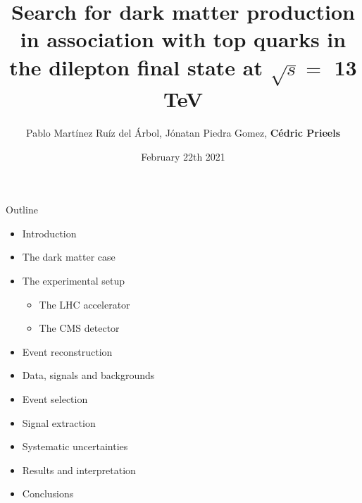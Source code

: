 \documentclass[8pt]{beamer}
\title{Search for dark matter production in association with top quarks in the dilepton final state at $\sqrt{s} = $ 13 TeV}
\date{\vspace{-3pt}February 22th 2021}
\author{Pablo Mart\'{i}nez Ru\'{i}z del \'{A}rbol, J\'{o}natan Piedra Gomez, \textbf{C\'{e}dric Prieels}}
\institute{Instituto de F\'{i}sica de Cantabria}
\begin{document}
\maketitle

\begin{frame}{Outline}
\justifying
\begin{itemize}
\item Introduction
\item The dark matter case
\item The experimental setup
\begin{itemize}
\item The LHC accelerator
\item The CMS detector
\end{itemize}

\item Event reconstruction
\item Data, signals and backgrounds
\item Event selection
\item Signal extraction
\item Systematic uncertainties
\item Results and interpretation
\item Conclusions
\end{itemize}
\end{frame}
\end{document}
